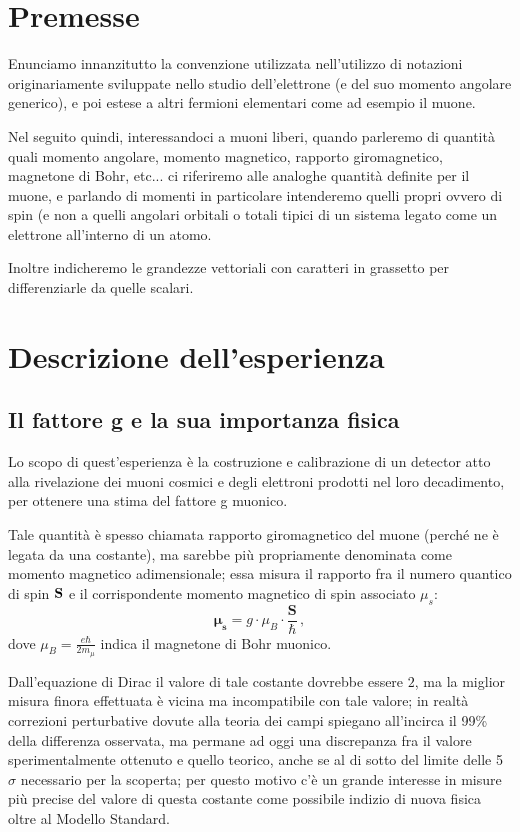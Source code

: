 \section{Premesse}

Enunciamo innanzitutto la convenzione utilizzata nell'utilizzo di notazioni originariamente sviluppate nello studio dell'elettrone (e del suo momento angolare generico), e poi estese a altri fermioni elementari come ad esempio il muone. \par
Nel seguito quindi, interessandoci a muoni liberi, quando parleremo di quantità quali momento angolare, momento magnetico, rapporto giromagnetico, magnetone di Bohr, etc... ci riferiremo alle analoghe quantità definite per il muone, e parlando di momenti in particolare intenderemo quelli propri ovvero di spin (e non a quelli angolari orbitali o totali tipici di un sistema legato come un elettrone all'interno di un atomo. \par
Inoltre indicheremo le grandezze vettoriali con caratteri in grassetto per differenziarle da quelle scalari. \par

\section{Descrizione dell'esperienza}
\subsection{Il fattore g e la sua importanza fisica}
Lo scopo di quest'esperienza è la costruzione e calibrazione di un detector atto alla rivelazione dei muoni cosmici e degli elettroni prodotti nel loro decadimento, per ottenere una stima del fattore g muonico. \par
Tale quantità è spesso chiamata rapporto giromagnetico del muone (perch\'e ne è legata da una costante), ma sarebbe più propriamente denominata come momento magnetico adimensionale; essa misura il rapporto fra il numero quantico di spin $\bf{S}$ e il corrispondente momento magnetico di spin associato $\mu_s$:
\begin{equation}
	\bm{\mu_s}=g\cdot \mu_B\cdot \frac{ \mathbf{S}}{\hbar} \, ,
	\label{eq:magnetic_moment}
\end{equation}
dove $\mu_B=\frac{e \hbar}{2 m_{\mu}}$ indica il magnetone di Bohr muonico. \par
Dall'equazione di Dirac il valore di tale costante dovrebbe essere $2$, ma la miglior misura finora effettuata è vicina ma incompatibile con tale valore; in realtà correzioni perturbative dovute alla teoria dei campi spiegano all'incirca il 99\% della differenza osservata, ma permane ad oggi una discrepanza fra il valore sperimentalmente ottenuto e quello teorico, anche se al di sotto del limite delle 5 $\sigma$ necessario per la scoperta; per questo motivo c'è un grande interesse in misure più precise del valore di questa costante come possibile indizio di nuova fisica oltre al Modello Standard. \cite{bib:Bennett:2006fi}
\par

